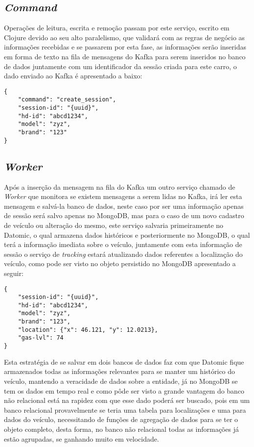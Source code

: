 \subsection{\textit{Command}}
Operações de leitura, escrita e remoção passam por este serviço, escrito em Clojure devido ao seu alto paralelismo, que validará com as regras de negócio as informações recebidas e se passarem por esta fase, as informações serão inseridas em forma de texto na fila de mensagens do Kafka para serem inseridos no banco de dados juntamente com um identificador da sessão criada para este carro, o dado enviado ao Kafka é apresentado a baixo:
\begin{lstlisting}
{
	"command": "create_session",
	"session-id": "{uuid}",
	"hd-id": "abcd1234",
	"model": "zyz",
	"brand": "123"
}
\end{lstlisting}

\subsection{\textit{Worker}}
Após a inserção da mensagem na fila do Kafka um outro serviço chamado de \textit{Worker} que monitora se existem mensagens a serem lidas no Kafka, irá ler esta mensagem e salvá-la banco de dados, neste caso por ser uma informação apenas de sessão será salvo apenas no MongoDB, mas para o caso de um novo cadastro de veículo ou alteração do mesmo, este serviço salvaria primeiramente no Datomic, o qual armazena dados históricos e posteriormente no MongoDB, o qual terá a informação imediata sobre o veículo, juntamente com esta informação de sessão o serviço de \textit{tracking} estará atualizando dados referentes a localização do veículo, como pode ser visto no objeto persistido no MongoDB apresentado a seguir: 
\begin{lstlisting}
{
	"session-id": "{uuid}",
	"hd-id": "abcd1234",
	"model": "zyz",
	"brand": "123",
	"location": {"x": 46.121, "y": 12.0213},
	"gas-lvl": 74
}
\end{lstlisting}

Esta estratégia de se salvar em dois bancos de dados faz com que Datomic fique armazenados todas as informações relevantes para se manter um histórico do veículo, mantendo a veracidade de dados sobre a entidade, já no MongoDB se tem os dados em tempo real e como pôde ser visto a grande vantagem do banco não relacional está na rapidez com que esse dado poderá ser buscado, pois em um banco relacional provavelmente se teria uma tabela para localizações e uma para dados do veículo, necessitando de funções de agregação de dados para se ter o objeto completo, desta forma, no banco não relacional todas as informações já estão agrupadas, se ganhando muito em velocidade.

